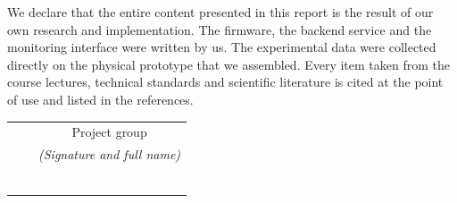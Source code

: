 \documentclass[a4paper, oneside, 13.5pt, top=2.5cm, bottom=2.5cm, left=3cm, right=2.5cm]{book}
\begin{document}
\begin{declaration}
We declare that the entire content presented in this report is the result of our own research and implementation. The firmware, the backend service and the monitoring interface were written by us. The experimental data were collected directly on the physical prototype that we assembled. Every item taken from the course lectures, technical standards and scientific literature is cited at the point of use and listed in the references.
\\
\begin{table}[!h]
\centering
\begin{tabular}{p{3cm} p{3cm} p{3cm} p{3cm}}
&   & \multicolumn{2}{c}{Project group} \\
&   & \multicolumn{2}{c}{\textit{(Signature and full name)}} \\
&   &                                  \\
&   &                                  \\
&   &                                  \\
&   &                                  \\
&   &                                  \\
&   &                                  \\
\end{tabular}
\end{table}
\end{declaration}
\newpage
\pagestyle{fancy}
\end{document}

